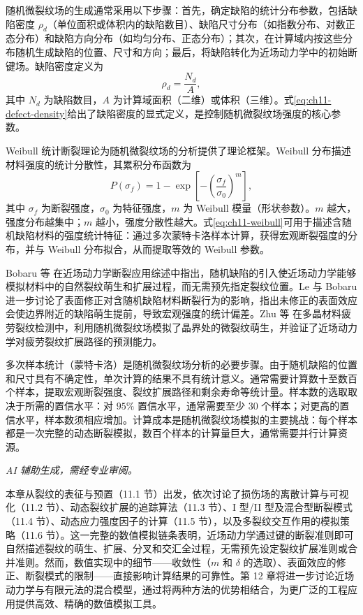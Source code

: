 随机微裂纹场的生成通常采用以下步骤：首先，确定缺陷的统计分布参数，包括缺陷密度 $\rho_d$（单位面积或体积内的缺陷数目）、缺陷尺寸分布（如指数分布、对数正态分布）和缺陷方向分布（如均匀分布、正态分布）；其次，在计算域内按这些分布随机生成缺陷的位置、尺寸和方向；最后，将缺陷转化为近场动力学中的初始断键场。缺陷密度定义为
\begin{equation}
\rho_d=\frac{N_d}{A},
\label{eq:ch11-defect-density}
\end{equation}
其中 $N_d$ 为缺陷数目，$A$ 为计算域面积（二维）或体积（三维）。式\eqref{eq:ch11-defect-density}给出了缺陷密度的显式定义，是控制随机微裂纹场强度的核心参数。

Weibull 统计断裂理论为随机微裂纹场的分析提供了理论框架。Weibull 分布描述材料强度的统计分散性，其累积分布函数为
\begin{equation}
P(\sigma_f)=1-\exp\left[-\left(\frac{\sigma_f}{\sigma_0}\right)^m\right],
\label{eq:ch11-weibull}
\end{equation}
其中 $\sigma_f$ 为断裂强度，$\sigma_0$ 为特征强度，$m$ 为 Weibull 模量（形状参数）。$m$ 越大，强度分布越集中；$m$ 越小，强度分散性越大。式\eqref{eq:ch11-weibull}可用于描述含随机缺陷材料的强度统计特征：通过多次蒙特卡洛样本计算，获得宏观断裂强度的分布，并与 Weibull 分布拟合，从而提取等效的 Weibull 参数。

Bobaru 等 \cite{Bobaru2016} 在近场动力学断裂应用综述中指出，随机缺陷的引入使近场动力学能够模拟材料中的自然裂纹萌生和扩展过程，而无需预先指定裂纹位置。Le 与 Bobaru \cite{LeBobaru2018} 进一步讨论了表面修正对含随机缺陷材料断裂行为的影响，指出未修正的表面效应会使边界附近的缺陷萌生提前，导致宏观强度的统计偏差。Zhu 等 \cite{Zhu2021} 在多晶材料疲劳裂纹检测中，利用随机微裂纹场模拟了晶界处的微裂纹萌生，并验证了近场动力学对疲劳裂纹扩展路径的预测能力。

多次样本统计（蒙特卡洛）是随机微裂纹场分析的必要步骤。由于随机缺陷的位置和尺寸具有不确定性，单次计算的结果不具有统计意义。通常需要计算数十至数百个样本，提取宏观断裂强度、裂纹扩展路径和剩余寿命等统计量。样本数的选取取决于所需的置信水平：对 $95\%$ 置信水平，通常需要至少 30 个样本；对更高的置信水平，样本数须相应增加。计算成本是随机微裂纹场模拟的主要挑战：每个样本都是一次完整的动态断裂模拟，数百个样本的计算量巨大，通常需要并行计算资源。

\emph{AI 辅助生成，需经专业审阅。}

本章从裂纹的表征与预置（11.1 节）出发，依次讨论了损伤场的离散计算与可视化（11.2 节）、动态裂纹扩展的追踪算法（11.3 节）、I 型/II 型及混合型断裂模式（11.4 节）、动态应力强度因子的计算（11.5 节），以及多裂纹交互作用的模拟策略（11.6 节）。这一完整的数值模拟链条表明，近场动力学通过键的断裂准则即可自然描述裂纹的萌生、扩展、分叉和交汇全过程，无需预先设定裂纹扩展准则或合并准则。然而，数值实现中的细节——收敛性（$m$ 和 $\delta$ 的选取）、表面效应的修正、断裂模式的限制——直接影响计算结果的可靠性。第 12 章将进一步讨论近场动力学与有限元法的混合模型，通过将两种方法的优势相结合，为更广泛的工程应用提供高效、精确的数值模拟工具。


